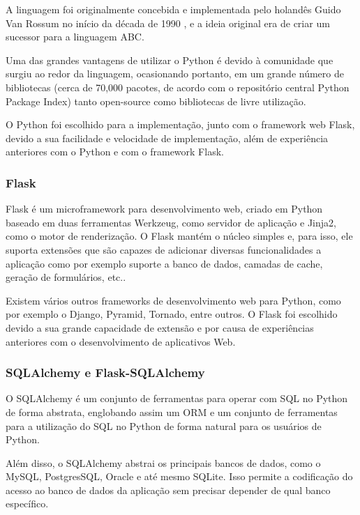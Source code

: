 \documentclass[
	article,			%
	11pt,				%
	oneside,			%
	a4paper,			%
	english,			%
	brazil,				%
	sumario=tradicional
	]{abntex2}
\begin{document}
A linguagem foi originalmente concebida e implementada pelo holandês Guido Van Rossum no início da década de 1990 \cite{pythonlicense}, e a ideia original era de criar um sucessor para a linguagem ABC.

Uma das grandes vantagens de utilizar o Python é devido à comunidade que surgiu ao redor da linguagem, ocasionando portanto, em um grande número de bibliotecas (cerca de 70,000 pacotes, de acordo com o repositório central Python Package Index)\cite{pypi} tanto open-source como bibliotecas de livre utilização.

O Python foi escolhido para a implementação, junto com o framework web Flask, devido a sua facilidade e velocidade de implementação, além de experiência anteriores com o Python e com o framework Flask.

\subsubsection{Flask}

Flask é um microframework para desenvolvimento web, criado em Python baseado em duas ferramentas Werkzeug, como servidor de aplicação e Jinja2, como o motor de renderização.
O Flask mantém o núcleo simples e, para isso, ele suporta extensões que são capazes de adicionar diversas funcionalidades a aplicação como por exemplo suporte a banco de dados, camadas de cache, geração de formulários, etc.. \cite{flask}

Existem vários outros frameworks de desenvolvimento web para Python, como por exemplo o Django, Pyramid, Tornado, entre outros.
O Flask foi escolhido devido a sua grande capacidade de extensão e por causa de experiências anteriores com o desenvolvimento de aplicativos Web.

\subsubsection{SQLAlchemy e Flask-SQLAlchemy}

O SQLAlchemy é um conjunto de ferramentas para operar com SQL no Python de forma abstrata, englobando assim um ORM e um conjunto de ferramentas para a utilização do SQL no Python de forma natural para os usuários de Python. \cite{sqlalchemy}

Além disso, o SQLAlchemy abstrai os principais bancos de dados, como o MySQL, PostgresSQL, Oracle e até mesmo SQLite.
Isso permite a codificação do acesso ao banco de dados da aplicação sem precisar depender de qual banco específico.
\end{document}
